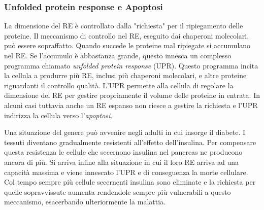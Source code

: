 \subsubsection{Unfolded protein response e Apoptosi}
{

La dimensione del RE è controllato dalla "richiesta" per il ripiegamento delle proteine. Il meccanismo di controllo nel RE, eseguito dai chaperoni molecolari, può essere sopraffatto. Quando succede le proteine mal ripiegate si accumulano nel RE. 
Se l'accumulo è abbastanza grande, questo innesca un complesso programma chiamato \textit{unfolded protein response} (UPR). Questo programma incita la cellula a produrre più RE, inclusi più chaperoni molecolari, e altre proteine riguardanti il controllo qualità. L'UPR permette alla cellula di regolare la dimensione del RE per gestire propriamente il volume delle proteine in entrata. In alcuni casi tuttavia anche un RE espanso non riesce a gestire la richiesta e l'UPR indirizza la cellula verso l'\textit{apoptosi}.

\par Una situazione del genere può avvenire negli adulti in cui insorge il diabete. I tessuti diventano gradualmente resistenti all'effetto dell'insulina. Per compensare questa resistenza le cellule che secernono insulina nel pancreas ne producono ancora di più. Si arriva infine alla situazione in cui il loro RE arriva ad una capacità massima e viene innescato l'UPR e di conseguenza la morte cellulare. Col tempo sempre più cellule secernenti insulina sono eliminate e la richiesta per quelle sopravvissute aumenta rendendole sempre più vulnerabili a questo meccanismo, esacerbando ulteriormente la malattia\supercite{alberts2018essential}.
}


